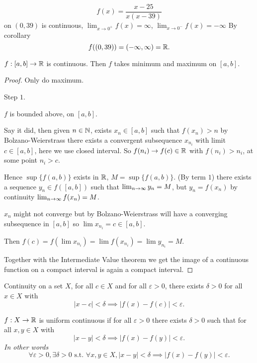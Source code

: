 \documentclass[10pt, a4paper]{article}
\begin{document}
\begin{example}
    \[
    f(x) = \frac{x - 25}{x(x - 39)}
    \]
    on $(0, 39)$ is continuous,
    $\lim_{x \rightarrow 0 ^ {+}}f(x) = \infty$,
    $\lim_{x \rightarrow 0 ^ {-}}f(x) = -\infty$
    By corollary
    \[
    f((0, 39)) = (-\infty, \infty) = \mathbb{R}.
    \]
\end{example}

\begin{theorem}
    $f : [a, b] \rightarrow \mathbb{R}$ is continuous.
    Then $f$ takes minimum and maximum on $[a, b]$.
    
    \begin{proof}
        Only do maximum.

        Step $1$.
        
        $f$ is bounded above,
        on $[a, b]$.

        Say it did,
        then given $n \in \mathbb{N}$,
        exists $x_n \in [a, b]$ such that $f(x_n) > n$ by Bolzano-Weierstrass there exists a convergent subsequence $x_{n_i}$ with limit $c \in [a, b]$,
        here we use closed interval.
        So $f(n_i) \rightarrow f(c) \in \mathbb{R}$ with $f(n_i) > n_i$,
        at some point $n_i > c$.

        Hence $\sup\{f(a, b)\}$ exists in $\mathbb{R}$,
        $M = \sup\{f(a, b)\}$.
        (By term $1$)
        there exists a sequence $y_n \in f([a, b])$ such that $\lim_{n \rightarrow \infty} y_n = M$,
        but $y_n = f(x_n)$ by continuity $\lim_{n \rightarrow \infty} f(x_n) = M$.

        $x_n$ might not converge but by Bolzano-Weierstrass will have a converging subsequence in $[a, b]$ so $\lim x_{n_i} = c \in [a, b]$.

        Then $f(c) = f(\lim x_{n_i}) = \lim f(x_{n_i}) = \lim y_{n_i} = M$.

        Together with the Intermediate Value theorem we get the image of a continuous function on a compact interval is again a compact interval.
    \end{proof}
\end{theorem}

\begin{definition}
    Continuity on a set $X$,
    for all $c \in X$ and for all $\varepsilon > 0$,
    there exists $\delta > 0$ for all $x \in X$ with
    \[
    |x - c| < \delta \implies |f(x) - f(c)| < \varepsilon.
    \]
\end{definition}

\begin{definition}
    $f : X \rightarrow \mathbb{R}$ is uniform continuous if for all $\varepsilon > 0$ there exists $\delta > 0$ such that for all $x, y \in X$ with
    \[
    |x - y| < \delta \implies |f(x) - f(y)| < \varepsilon.
    \]
    \textit{In other words}
    \[
    \forall \varepsilon > 0, \exists \delta > 0 \text{ s.t. } \forall x, y \in X, |x - y| < \delta \implies |f(x) - f(y)| < \varepsilon.
    \]
\end{definition}
\end{document}
